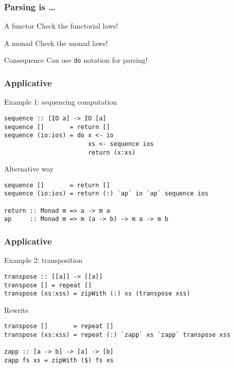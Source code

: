 \documentclass{beamer}
\begin{document}
\begin{frame}[fragile]
  \frametitle{Parsing is \dots}
  \begin{block}{A functor}
    Check the functorial laws!
  \end{block}
  \begin{block}{A monad}
    Check the monad laws!
  \end{block}
  \begin{alertblock}{Consequence}
    Can use \texttt{do} notation for parsing!
  \end{alertblock}
\end{frame}


\begin{frame}[fragile]
  \frametitle{Applicative}
  \begin{alertblock}{Example 1: sequencing computation}
\begin{lstlisting}
sequence :: [IO a] -> IO [a]
sequence []       = return []
sequence (io:ios) = do x <- io
                       xs <- sequence ios
                       return (x:xs)
\end{lstlisting}  
  \end{alertblock}
  \begin{alertblock}{Alternative way}
\begin{lstlisting}
sequence []       = return []
sequence (io:ios) = return (:) `ap` io `ap` sequence ios

return :: Monad m => a -> m a
ap     :: Monad m => m (a -> b) -> m a -> m b
\end{lstlisting}
  \end{alertblock}
\end{frame}



\begin{frame}[fragile]
 \frametitle{Applicative}
 \begin{exampleblock}{Example 2: transposition}
\begin{lstlisting}
transpose :: [[a]] -> [[a]]
transpose [] = repeat []
transpose (xs:xss) = zipWith (:) xs (transpose xss)
\end{lstlisting}
 \end{exampleblock}
 \begin{alertblock}{Rewrite}
\begin{lstlisting}
transpose []       = repeat []
transpose (xs:xss) = repeat (:) `zapp` xs `zapp` transpose xss

zapp :: [a -> b] -> [a] -> [b]
zapp fs xs = zipWith ($) fs xs
\end{lstlisting}
 \end{alertblock}
\end{frame}             
\end{document}
